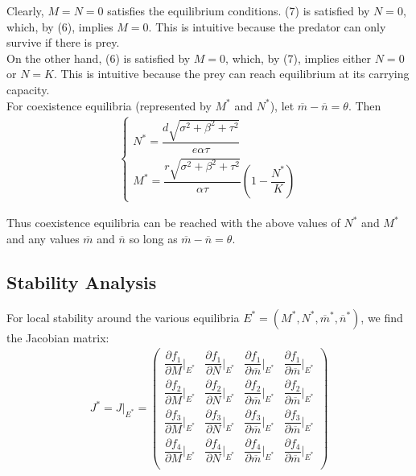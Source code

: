 \documentclass[10pt]{beamer}
\begin{document}
\vskip 10pt

\noindent Clearly, $M = N = 0$ satisfies the equilibrium conditions.  (7) is satisfied by $N = 0$, which, by (6), implies $M = 0$.  This is intuitive because the predator can only survive if there is prey. \\

\noindent On the other hand, (6) is satisfied by $M = 0$, which, by (7), implies either $N = 0$ or $N = K$.  This is intuitive because the prey can reach equilibrium at its carrying capacity. \\

\noindent For coexistence equilibria (represented by $M^*$ and $N^*$), let $\overline{m} - \overline{n} = \theta$.  Then
\begin{align*}
	\begin{cases}
		N^* = \dfrac{d\sqrt{\sigma^2 + \beta^2 + \tau^2}}{e \alpha \tau} \\[.25cm]
		M^* = \dfrac{r\sqrt{\sigma^2 + \beta^2 + \tau^2}}{\alpha \tau}\left(1 - \dfrac{N^*}{K}\right)
	\end{cases}
\end{align*}

\noindent Thus coexistence equilibria can be reached with the above values of $N^*$ and $M^*$ and any values $\overline{m}$ and $\overline{n}$ so long as $\overline{m} - \overline{n} = \theta$.

\vskip 30pt
							\subsection{Stability Analysis}

\noindent For local stability around the various equilibria $E^* = (M^*, N^*, \overline{m}^*, \overline{n}^*)$, we find the Jacobian matrix:
\begin{align*}
	J^* = J\big|_{E^*} = \left(
	\begin{array}{cccc}
		\dfrac{\partial f_1}{\partial M}\bigg|_{E^*} & \dfrac{\partial f_1}{\partial N}\bigg|_{E^*} & \dfrac{\partial f_1}{\partial \overline{m}}\bigg|_{E^*} & \dfrac{\partial f_1}{\partial \overline{m}}\bigg|_{E^*} \\[.4cm]
		\dfrac{\partial f_2}{\partial M}\bigg|_{E^*} & \dfrac{\partial f_2}{\partial N}\bigg|_{E^*} & \dfrac{\partial f_2}{\partial \overline{m}}\bigg|_{E^*} & \dfrac{\partial f_2}{\partial \overline{m}}\bigg|_{E^*} \\[.4cm]
		\dfrac{\partial f_3}{\partial M}\bigg|_{E^*} & \dfrac{\partial f_3}{\partial N}\bigg|_{E^*} & \dfrac{\partial f_3}{\partial \overline{m}}\bigg|_{E^*} & \dfrac{\partial f_3}{\partial \overline{m}}\bigg|_{E^*} \\[.4cm]
		\dfrac{\partial f_4}{\partial M}\bigg|_{E^*} & \dfrac{\partial f_4}{\partial N}\bigg|_{E^*} & \dfrac{\partial f_4}{\partial \overline{m}}\bigg|_{E^*} & \dfrac{\partial f_4}{\partial \overline{m}}\bigg|_{E^*} \\
	\end{array}
	\right)
\end{align*}
\end{document}
